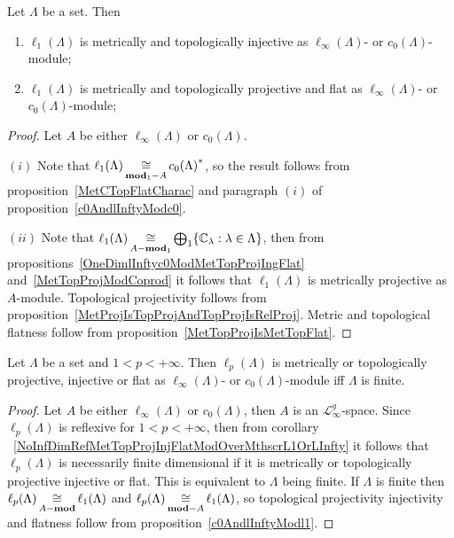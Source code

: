 \begin{proposition}\label{c0AndlInftyModl1} Let $\Lambda$ be a set. Then

\begin{enumerate}[label = (\roman*)]
    \item $\ell_1(\Lambda)$ is metrically and topologically injective as
    $\ell_\infty(\Lambda)$- or $c_0(\Lambda)$-module;

    \item $\ell_1(\Lambda)$ is metrically and topologically projective and 
    flat as $\ell_\infty(\Lambda)$- or $c_0(\Lambda)$-module;
\end{enumerate}
\end{proposition}
\begin{proof} Let $A$ be either $\ell_\infty(\Lambda)$ or $c_0(\Lambda)$.

$(i)$ Note that $\ell_1(\Lambda)\mathop{\mathbin{\cong}}\limits_{\mathbf{mod}_1-A}{c_0(\Lambda)}^*$, so the
result follows from proposition~\ref{MetCTopFlatCharac} and paragraph $(i)$ of
proposition~\ref{c0AndlInftyModc0}.

$(ii)$ Note that 
$\ell_1(\Lambda)
\mathop{\mathbin{\cong}}\limits_{A-\mathbf{mod}_1}
\bigoplus_1 \{\mathbb{C}_\lambda:\lambda\in\Lambda \}$, then from
propositions~\ref{OneDimlInftyc0ModMetTopProjIngFlat}
and~\ref{MetTopProjModCoprod} it follows that $\ell_1(\Lambda)$ is metrically
projective as $A$-module. Topological projectivity follows from
proposition~\ref{MetProjIsTopProjAndTopProjIsRelProj}. Metric and topological
flatness follow from proposition~\ref{MetTopProjIsMetTopFlat}.
\end{proof}

\begin{proposition}\label{c0AndlInftyModlp} Let $\Lambda$ be a set and
$1<p<+\infty$. Then $\ell_p(\Lambda)$ is metrically or topologically projective,
injective or flat as $\ell_\infty(\Lambda)$- or $c_0(\Lambda)$-module iff
$\Lambda$ is finite.
\end{proposition}
\begin{proof} Let $A$ be either $\ell_\infty(\Lambda)$ or $c_0(\Lambda)$, then
$A$ is an $\mathscr{L}_\infty^g$-space. Since $\ell_p(\Lambda)$ is reflexive for
$1<p<+\infty$, then from corollary
~\ref{NoInfDimRefMetTopProjInjFlatModOverMthscrL1OrLInfty} it follows that
$\ell_p(\Lambda)$ is necessarily finite dimensional if it is metrically or
topologically projective injective or flat. This is equivalent to $\Lambda$
being finite. If $\Lambda$ is finite then
$\ell_p(\Lambda)\mathop{\mathbin{\cong}}\limits_{A-\mathbf{mod}}\ell_1(\Lambda)$ and
$\ell_p(\Lambda)\mathop{\mathbin{\cong}}\limits_{\mathbf{mod}-A}\ell_1(\Lambda)$, so topological
projectivity injectivity and flatness follow from
proposition~\ref{c0AndlInftyModl1}.
\end{proof}

